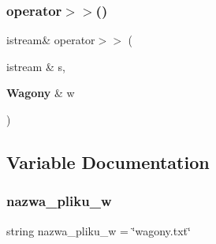 \subsubsection{operator$>$$>$()}
{\footnotesize\ttfamily istream\& operator$>$$>$ (\begin{DoxyParamCaption}\item[{istream \&}]{s,  }\item[{\textbf{ Wagony} \&}]{w }\end{DoxyParamCaption})}



\subsection{Variable Documentation}
\mbox{\label{wagony_8cpp_affc28c45363f4e0391cc625fde56b6d6}} 
\subsubsection{nazwa\+\_\+pliku\+\_\+w}
{\footnotesize\ttfamily string nazwa\+\_\+pliku\+\_\+w = \char`\"{}wagony.\+txt\char`\"{}}

